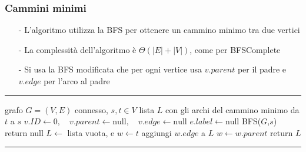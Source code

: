 \documentclass[a4paper]{article}
\makeatletter
\newenvironment{algo}[4]{
	\noindent\rule{\textwidth}{0.4pt}
	\begin{algorithmic}[1]
		\addtocounter{ALG@line}{-1}
		\Procedure{#1}{#2}
		\Require #3
		\Ensure #4
		\Statex }{
		\EndProcedure
	\end{algorithmic}
	\rule{\textwidth}{0.4pt}}
\makeatother
\begin{document}
\subsubsection*{Cammini minimi}
\begin{itemize}[topsep=3pt, itemsep=0pt]
	\item[-] L'algoritmo utilizza la BFS per ottenere un cammino minimo tra due vertici
	\item[-] La complessità dell'algoritmo è \(\Theta(|E| + |V|)\), come per BFSComplete
	\item[-] Si usa la BFS modificata che per ogni vertice usa \(v.parent\) per il padre e \(v.edge\) per l'arco al padre
\end{itemize}
\begin{algo}{}{$G$, $s$, $t$}{grafo $G = (V,E)$ connesso, $s,t \in V$}{lista $L$ con gli archi del cammino minimo da \(t\) a \(s\)}
	  \(v.I\!D \gets 0, \quad v.parent \gets \text{null}, \quad v.edge \gets \text{null}\)
	\EndFor
	 \(e.label \gets \text{null}\)
	\EndFor
	\State BFS(\(G\),\(s\))
	 return null
	\Else
		\State \(L \gets\) lista vuota, e \(w \gets t\)
			\State aggiungi \(w.edge\) a \(L\)
			\State \(w \gets w.parent\)
		\EndWhile
		\State return \(L\)
	\EndIf
\end{algo}
\end{document}
